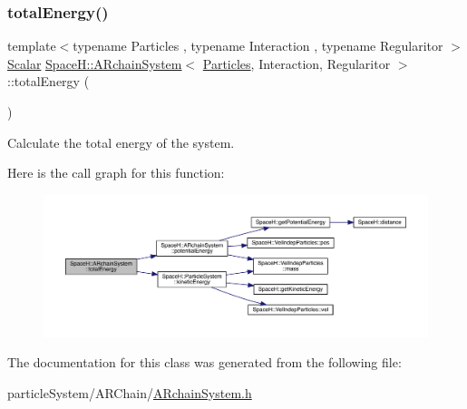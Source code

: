 \subsubsection{\texorpdfstring{total\+Energy()}{totalEnergy()}}
{\footnotesize\ttfamily template$<$typename Particles , typename Interaction , typename Regularitor $>$ \\
\mbox{\hyperlink{class_space_h_1_1_a_rchain_system_acaaa03940944dd5d6978c575888dd308}{Scalar}} \mbox{\hyperlink{class_space_h_1_1_a_rchain_system}{Space\+H\+::\+A\+Rchain\+System}}$<$ \mbox{\hyperlink{struct_space_h_1_1_particles}{Particles}}, Interaction, Regularitor $>$\+::total\+Energy (\begin{DoxyParamCaption}{ }\end{DoxyParamCaption})\hspace{0.3cm}{\ttfamily [inline]}}



Calculate the total energy of the system. 

Here is the call graph for this function\+:
\nopagebreak
\begin{figure}[H]
\begin{center}
\leavevmode
\includegraphics[width=350pt]{class_space_h_1_1_a_rchain_system_a069b5ae075413b26fa177df689bf044d_cgraph}
\end{center}
\end{figure}


The documentation for this class was generated from the following file\+:\begin{DoxyCompactItemize}
\item 
particle\+System/\+A\+R\+Chain/\mbox{\hyperlink{_a_rchain_system_8h}{A\+Rchain\+System.\+h}}\end{DoxyCompactItemize}
